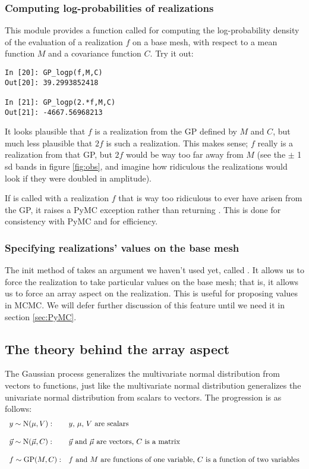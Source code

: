 \documentclass{manual}
\begin{document}
\subsubsection{Computing log-probabilities of realizations}\label{subsub:logp}
This module provides a function called  for computing the log-probability density of the evaluation of a realization $f$ on a base mesh, with respect to a mean function $M$ and a covariance function $C$. Try it out:
\begin{verbatim}
In [20]: GP_logp(f,M,C)
Out[20]: 39.2993852418

In [21]: GP_logp(2.*f,M,C)
Out[21]: -4667.56968213
\end{verbatim}
It looks plausible that $f$ is a realization from the GP defined by $M$ and $C$, but much less plausible that $2f$ is such a realization. This makes sense; $f$ really is a realization from that GP, but $2f$ would be way too far away from $M$ (see the $\pm$ 1 sd bands in figure \ref{fig:obs}, and imagine how ridiculous the realizations would look if they were doubled in amplitude).

If  is called with a realization $f$ that is way too ridiculous to ever have arisen from the GP, it raises a PyMC  exception rather than returning . This is done for consistency with PyMC and for efficiency.

\subsubsection{Specifying realizations' values on the base mesh}\label{subsub:force}

The init method of  takes an argument we haven't used yet, called . It allows us to force the realization to take particular values on the base mesh; that is, it allows us to force an array aspect on the realization. This is useful for proposing values in MCMC. We will defer further discussion of this feature until we need it in section \ref{sec:PyMC}. 

\subsection{The theory behind the array aspect} 
The Gaussian process generalizes the multivariate normal distribution from vectors to functions, just like the multivariate normal distribution generalizes the univariate normal distribution from scalars to vectors. The progression is as follows:
\begin{equation}
    \begin{array}{ll}
        y\sim\textup N(\mu,V): & \textup{$y$, $\mu$, $V$ are scalars}\\\\
        \vec y\sim\textup N(\vec \mu,C): & \textup{$\vec y$ and $\vec \mu$ are vectors, $C$ is a matrix}\\\\
        f\sim\textup{GP}(M, C): & \textup{$f$ and $M$ are functions of one variable, $C$ is a function of two variables}
    \end{array}
\end{equation}
\end{document}
